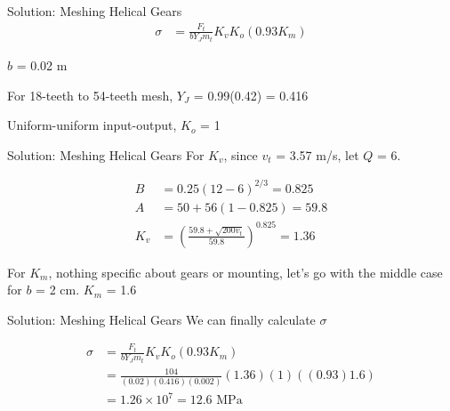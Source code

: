 \documentclass[10pt, svgnames]{beamer}
\begin{document}
\begin{frame}[label={sec:orge6e6c85}]{Solution: Meshing Helical Gears}
\begin{align*}
    \sigma &= \frac{F_{t}}{bY_{J}m_{t}}K_{v}K_{o}(0.93K_{m})
\end{align*}

\(b\) = 0.02 m

For 18-teeth to 54-teeth mesh, \(Y_{J}\) = 0.99(0.42) = 0.416

Uniform-uniform input-output, \(K_{o}\) = 1
\end{frame}

\begin{frame}[label={sec:orgdd7ebc8}]{Solution: Meshing Helical Gears}
For \(K_{v}\), since \(v_{t}\) = 3.57 m/s, let \(Q\) = 6.

\begin{align*}
     B &= 0.25(12 - 6)^{2/3} = 0.825 \\
     A &= 50 + 56(1 - 0.825) = 59.8 \\
     K_{v} &= \left( \frac{59.8 + \sqrt{200v_{t}}}{59.8} \right)^{0.825} = 1.36
\end{align*}

For \(K_{m}\), nothing specific about gears or mounting, let's go with the middle case for \(b\) = 2 cm. \(K_{m}\) = 1.6
\end{frame}

\begin{frame}[label={sec:org34cd9ff}]{Solution: Meshing Helical Gears}
We can finally calculate \(\sigma\)

\begin{align*}
    \sigma &= \frac{F_{t}}{bY_{J}m_{t}}K_{v}K_{o}(0.93K_{m}) \\
           &= \frac{104}{(0.02)(0.416)(0.002)}(1.36)(1)((0.93)1.6) \\
           &= 1.26 \times 10^{7} = 12.6 \text{ MPa}
\end{align*}
\end{frame}
\end{document}
